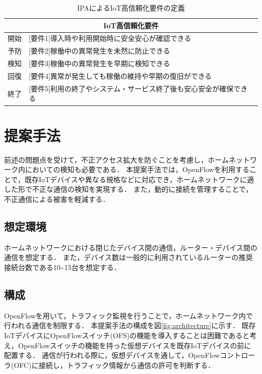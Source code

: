 \documentclass[a4paper,10pt,twocolumn,uplatex]{jsarticle}
\begin{document}
\begin{table}[!bt]
  \caption{IPAによるIoT高信頼化要件の定義}
  \label{tab:IPA}
  \centering
  \begin{tabular}{c|l}
    \hline
    \multicolumn{2}{c}{IoT高信頼化要件}                                      \\
    \hline \hline
    開始 & [要件1]導入時や利用開始時に安全安心が確認できる                   \\
    予防 & [要件2]稼働中の異常発生を未然に防止できる                         \\
    検知 & [要件3]稼働中の異常発生を早期に検知できる                         \\
    回復 & [要件4]異常が発生しても稼働の維持や早期の復旧ができる             \\
    終了 & [要件5]利用の終了やシステム・サービス終了後も安心安全が確保できる \\
    \hline
  \end{tabular}
\end{table}



\section{提案手法}
前述の問題点を受けて，不正アクセス拡大を防ぐことを考慮し，ホームネットワーク内においての検知も必要である．
本提案手法では，OpenFlowを利用することで，既存IoTデバイスや異なる規格などに対応でき，ホームネットワークに適した形で不正な通信の検知を実現する．
また，動的に接続を管理することで，不正通信による被害を軽減する．

\subsection{想定環境}
ホームネットワークにおける閉じたデバイス間の通信，ルーター・デバイス間の通信を想定する．
また，デバイス数は一般的に利用されているルーターの推奨接続台数である10\textasciitilde15台を想定する．

\subsection{構成}
OpenFlowを用いて，トラフィック監視を行うことで，ホームネットワーク内で行われる通信を制限する．
本提案手法の構成を図\ref{fig:architecture}に示す．
既存IoTデバイスにOpenFlowスイッチ(OFS)の機能を導入することは困難であると考え，OpenFlowスイッチの機能を持った仮想デバイスを既存IoTデバイスの前に配置する．
通信が行われる際に，仮想デバイスを通して，OpenFlowコントローラ(OFC)に接続し，トラフィック情報から通信の許可を判断する．
\end{document}
